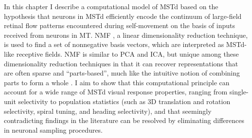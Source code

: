In this chapter I describe a computational model of MSTd based on the hypothesis 
that neurons in MSTd efficiently encode the continuum of large-field retinal flow patterns
encountered during self-movement on the basis of inputs received from neurons in MT.
\acf{NMF} \citep{PaateroTapper1994,LeeSeung1999,LeeSeung2001},
a linear dimensionality reduction technique, is used to find a set of 
nonnegative basis vectors, which are interpreted as MSTd-like receptive fields. 
\ac{NMF} is similar to \acf{PCA} and \acf{ICA}, 
but unique among these dimensionality reduction techniques in that it can recover
representations that are often sparse and “parts-based”, much like the intuitive notion 
of combining parts to form a whole \citep{LeeSeung1999}.
I aim to show that this computational principle can account for a wide range of 
MSTd visual response properties, ranging from single-unit selectivity to 
population statistics (such as 3D translation and rotation selectivity, spiral tuning, 
and heading selectivity), and that seemingly contradicting findings in the literature 
can be resolved by eliminating differences in neuronal sampling procedures.


